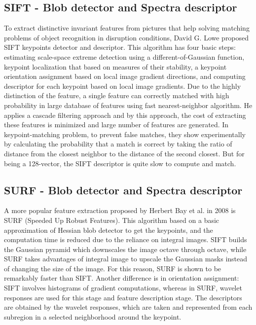 \documentclass[letterpaper, 10 pt, conference]{ieeeconf}  %
\begin{document}
\subsection{SIFT - Blob detector and Spectra descriptor}
To extract distinctive invariant features from pictures that help solving matching problems of object recognition in disruption conditions, David G. Lowe proposed SIFT\cite{sift} keypoints detector and descriptor. This algorithm has four basic steps: estimating scale-space extreme detection using a different-of-Gaussian function, keypoint localization that based on measures of their stability, a keypoint orientation assignment based on local image gradient directions, and computing descriptor for each keypoint based on local image gradients. Due to the highly distinction of the feature, a single feature can correctly matched with high probability in large database of features using fast nearest-neighbor algorithm. He applies a cascade filtering approach and by this approach, the cost of extracting these features is minimized and large number of features are generated. In keypoint-matching problem, to prevent false matches, they show experimentally by calculating the probability that a match is correct by taking the ratio of distance from the closest neighbor to the distance of the second closest. But for being a 128-vector, the SIFT descriptor is quite slow to compute and match\cite{brief}. \par
\subsection{SURF - Blob detector and Spectra descriptor}
A more popular feature extraction proposed by Herbert Bay et al. in 2008 is SURF (Speeded Up Robust Features)\cite{surf}. This algorithm based on a basic approximation of Hessian blob detector to get the keypoints, and the computation time is reduced due to the reliance on integral images. SIFT builds the Gaussian pyramid which downscales the image octave through octave, while SURF takes advantages of integral image to upscale the Gaussian masks instead of changing the size of the image. For this reason, SURF is shown to be remarkably faster than SIFT. Another difference is in orientation assignment: SIFT involves histograms of gradient computations, whereas in SURF, wavelet responses are used for this stage and feature description stage. The descriptors are obtained by the wavelet responses, which are taken and represented from each subregion in a selected neighborhood around the keypoint.  \par
\end{document}
